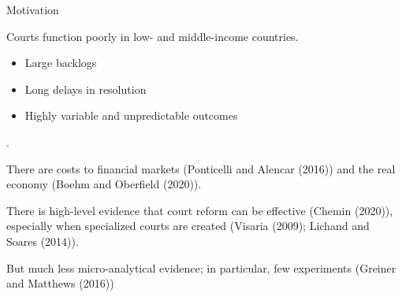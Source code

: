 \documentclass[9pt]{beamer}
\begin{document}
\begin{frame}{Motivation}{}

  Courts function poorly in low- and middle-income countries.
  \begin{itemize}
      \item Large backlogs
      \item Long delays in resolution
      \item Highly variable and unpredictable outcomes
  \end{itemize}. 
  
  \vspace{2mm}
  \noindent There are costs to financial markets (Ponticelli and Alencar (2016)) and the real economy (Boehm and Oberfield (2020)). 
  
  \pause
  \vspace{2mm}
  There is high-level evidence that court reform can be effective (Chemin (2020)), especially when specialized courts are created (Visaria (2009); Lichand and Soares (2014)). 
  
  \vspace{2mm}
  But much less micro-analytical evidence; in particular, few experiments (Greiner and Matthews (2016))
  
  \end{frame}
\end{document}
